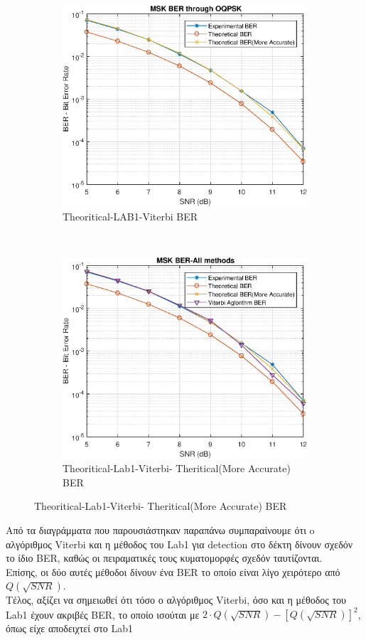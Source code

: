\documentclass{article}
\begin{document}
\begin{figure}[h!]
	\centering
	\begin{subfigure}[t]{0.5\textwidth}
		\centering
		\includegraphics[width=\linewidth]{./results/epsFig1}
		\caption{Theoritical-LAB1-Viterbi BER}
	\end{subfigure}%
	~
	\begin{subfigure}[t]{0.5\textwidth}
		\centering
		\includegraphics[width=\linewidth]{./results/epsFig3}
		\caption{Theoritical-Lab1-Viterbi- Theritical(More Accurate) BER}
	\end{subfigure}
\end{figure}
\noindent
Από τα διαγράμματα που παρουσιάστηκαν παραπάνω συμπαραίνουμε ότι o αλγόριθμος Viterbi και η μέθοδος του Lab1 για detection στο δέκτη δίνουν σχεδόν το ίδιο BER, καθώς οι πειραματικές τους κυματομορφές σχεδόν ταυτίζονται. \\
Eπίσης, οι δύο αυτές μέθοδοι δίνουν ένα BER το οποίο είναι λίγο χειρότερο από $Q(\sqrt{SNR})$. \\
Tέλος, αξίζει να σημειωθεί ότι τόσο ο αλγόριθμος Viterbi, όσο και η μέθοδος του Lab1 έχουν ακριβές ΒER, το οποίο ισούται με $2 \cdot  Q(\sqrt{SNR}) - [Q(\sqrt{SNR})]^2$, όπως είχε αποδειχτεί στο Lab1
\end{document}
